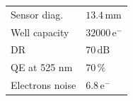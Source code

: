 \begin{frame}
\begin{columns}[T]
\begin{column}{0.65\textwidth}
\begin{tabularx}{\linewidth}{XX}
        Sensor diag.    & $13.4\,\mathrm{mm}$                              \\
        Well capacity   & $32000\,\mathrm{e^{-}}$                          \\
        DR              & $70\,\mathrm{dB}$                                \\
        QE at 525 nm    & $70\,\mathrm{\%}$                                \\
        Electrons noise & $6.8\,\mathrm{e^{-}}$                            \\
        \bottomrule
      \end{tabularx}
    \end{column}
  \end{columns}
\end{frame}


